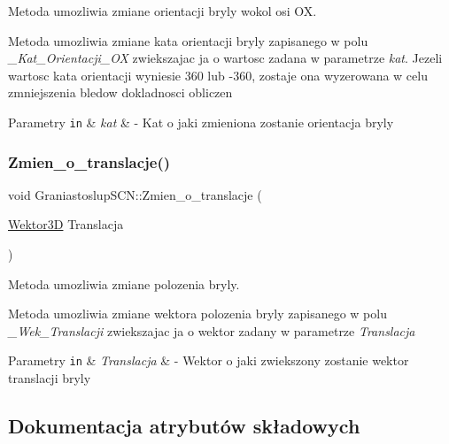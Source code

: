 Metoda umozliwia zmiane orientacji bryly wokol osi OX. 

Metoda umozliwia zmiane kata orientacji bryly zapisanego w polu {\itshape \+\_\+\+Kat\+\_\+\+Orientacji\+\_\+\+OX} zwiekszajac ja o wartosc zadana w parametrze {\itshape kat}. Jezeli wartosc kata orientacji wyniesie 360 lub -\/360, zostaje ona wyzerowana w celu zmniejszenia bledow dokladnosci obliczen


\begin{DoxyParams}[1]{Parametry}
\mbox{\tt in}  & {\em kat} & -\/ Kat o jaki zmieniona zostanie orientacja bryly \\
\hline
\end{DoxyParams}
\mbox{\label{classGraniastoslupSCN_a65db4e5bc006a5969f5a2ebb8b2adaea}} 
\subsubsection{\texorpdfstring{Zmien\+\_\+o\+\_\+translacje()}{Zmien\_o\_translacje()}}
{\footnotesize\ttfamily void Graniastoslup\+S\+C\+N\+::\+Zmien\+\_\+o\+\_\+translacje (\begin{DoxyParamCaption}\item[{\hyperlink{classSWektor}{Wektor3D}}]{Translacja }\end{DoxyParamCaption})\hspace{0.3cm}{\ttfamily [inline]}}



Metoda umozliwia zmiane polozenia bryly. 

Metoda umozliwia zmiane wektora polozenia bryly zapisanego w polu {\itshape \+\_\+\+Wek\+\_\+\+Translacji} zwiekszajac ja o wektor zadany w parametrze {\itshape Translacja} 


\begin{DoxyParams}[1]{Parametry}
\mbox{\tt in}  & {\em Translacja} & -\/ Wektor o jaki zwiekszony zostanie wektor translacji bryly \\
\hline
\end{DoxyParams}


\subsection{Dokumentacja atrybutów składowych}
\mbox{\label{classGraniastoslupSCN_a6c82bb652a2a7ebefc166864af4be36a}} 
